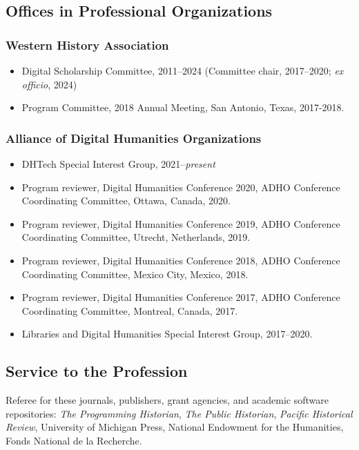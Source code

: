 \documentclass[10pt]{article}
\begin{document}
\subsection*{Offices in Professional Organizations}

\subsubsection*{Western History Association}

\begin{itemize}
  \item Digital Scholarship Committee, 2011--2024 (Committee chair, 2017--2020; \textit{ex officio}, 2024)
  \item Program Committee, 2018 Annual Meeting, San Antonio, Texas, 2017-2018.
\end{itemize}

\subsubsection*{Alliance of Digital Humanities Organizations}

\begin{itemize}
  \item DHTech Special Interest Group, 2021--\textit{present}
  \item Program reviewer, Digital Humanities Conference 2020, ADHO Conference Coordinating Committee, Ottawa, Canada, 2020.
  \item Program reviewer, Digital Humanities Conference 2019, ADHO Conference Coordinating Committee, Utrecht, Netherlands, 2019.
  \item Program reviewer, Digital Humanities Conference 2018, ADHO Conference Coordinating Committee, Mexico City, Mexico, 2018.
  \item Program reviewer, Digital Humanities Conference 2017, ADHO Conference Coordinating Committee, Montreal, Canada, 2017.
  \item Libraries and Digital Humanities Special Interest Group, 2017--2020.
\end{itemize}

\subsection*{Service to the Profession}

Referee for these journals, publishers, grant agencies, and academic software repositories: \textit{The Programming Historian}, \textit{The Public Historian}, \textit{Pacific Historical Review}, University of Michigan Press, National Endowment for the Humanities, Fonds National de la Recherche.
\end{document}
